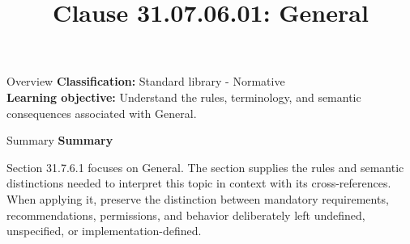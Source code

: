 \documentclass[10pt,letterpaper]{article}
\title{Clause 31.07.06.01: General}
\author{}
\date{}
\begin{document}
\maketitle
\begin{CornellOverviewBox}{Overview}
\textbf{Classification:} Standard library - Normative\\[2pt]
\textbf{Learning objective:} Understand the rules, terminology, and semantic consequences associated with General.
\end{CornellOverviewBox}\begin{CornellSummaryBox}{Summary}
{\sffamily\bfseries\color{Accent} Summary}\par\vspace{3pt}Section 31.7.6.1 focuses on General. The section supplies the rules and semantic distinctions needed to interpret this topic in context with its cross-references. When applying it, preserve the distinction between mandatory requirements, recommendations, permissions, and behavior deliberately left undefined, unspecified, or implementation-defined.
\end{CornellSummaryBox}
\end{document}
